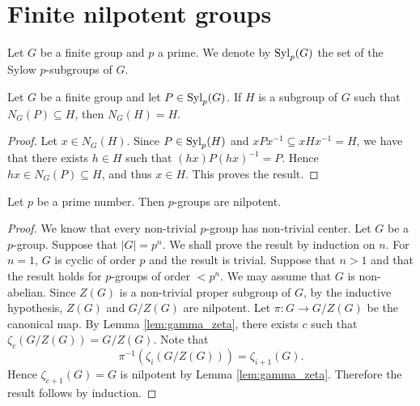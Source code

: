\section*{Finite nilpotent groups}

Let $G$ be a finite group and $p$ a prime. We denote by $\mathrm{Syl}_p(G)$ the set of the Sylow $p$-subgroups of $G$.

\begin{lemma}
	\label{lemma:N_G(H)=H}
	Let $G$ be a finite group and let $P\in\mathrm{Syl}_p(G)$. If $H$ is a subgroup of $G$
	such that $N_G(P)\subseteq H$, then $N_G(H)=H$.
\end{lemma}

\begin{proof}
	Let $x\in N_G(H)$. Since $P\in\mathrm{Syl}_p(H)$ and $xPx^{-1}\subseteq xHx^{-1}=H$, we have that there exists
	$h\in H$ such that $(hx)P(hx)^{-1}=P$. Hence $hx\in
	N_G(P)\subseteq H$, and thus $x\in H$. This proves the result. 
\end{proof}

%

\begin{lemma}\label{pgroup}
	Let $p$ be a prime number. Then $p$-groups are nilpotent.
\end{lemma}

\begin{proof}
    We know that every non-trivial $p$-group has non-trivial center. Let $G$ be a $p$-group. Suppose that $|G|=p^n$. We shall prove the result by induction on $n$. For $n=1$, $G$ is cyclic of order $p$ and the result is trivial. Suppose that $n>1$ and that the result holds for $p$-groups of order $<p^n$. We may assume that $G$ is non-abelian. Since $Z(G)$ is a non-trivial proper subgroup of $G$, by the inductive hypothesis, $Z(G)$ and $G/Z(G)$ are nilpotent. Let $\pi\colon G\rightarrow G/Z(G)$ be the canonical map. By Lemma \ref{lem:gamma_zeta}, there exists $c$ such that $\zeta_c(G/Z(G))=G/Z(G)$. Note that
    \[ \pi^{-1}(\zeta_i(G/Z(G)))=\zeta_{i+1}(G).\]
    Hence $\zeta_{c+1}(G)=G$ is nilpotent by Lemma \ref{lem:gamma_zeta}. Therefore the result follows by induction. 
\end{proof}

